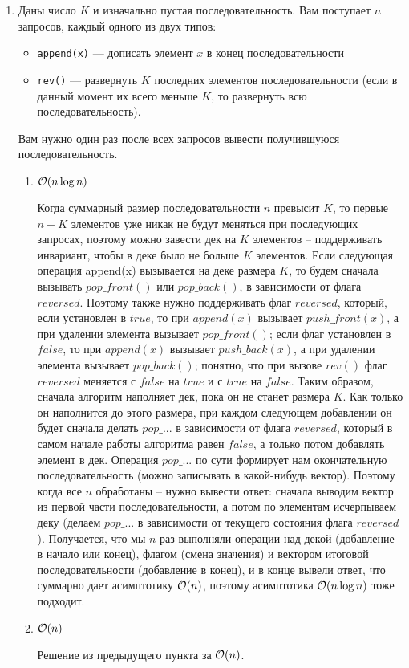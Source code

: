 \begin{enumerate}
  \item
    Даны число $K$ и изначально пустая последовательность. Вам поступает $n$ запросов, каждый одного из двух типов:
    \begin{itemize}
      \item \texttt{append(x)} --- дописать элемент $x$ в конец последовательности
      \item \texttt{rev()} ---
        развернуть $K$ последних элементов последовательности (если в данный момент их всего меньше $K$, то
        развернуть всю последовательность).
    \end{itemize}
    Вам нужно один раз после всех запросов вывести получившуюся последовательность.
    \begin{enumerate}
      \item $\mathcal{O}(n \log{n})$
      \begin{solution}
        Когда суммарный размер последовательности $n$ превысит $K$, то первые $n-K$ элементов уже никак не будут меняться при последующих запросах, поэтому можно завести дек на $K$ элементов -- поддерживать инвариант, чтобы в деке было не больше $K$ элементов. Если следующая операция append(x) вызывается на деке размера $K$, то будем сначала вызывать $pop\_front()$ или $pop\_back()$, в зависимости от флага $reversed$. Поэтому также нужно поддерживать флаг $reversed$, который, если установлен в $true$, то при $append(x)$ вызывает $push\_front(x)$, а при удалении элемента вызывает $pop\_front()$; если флаг установлен в $false$, то при $append(x)$ вызывает $push\_back(x)$, а при удалении элемента вызывает $pop\_back()$; понятно, что при вызове $rev()$ флаг $reversed$ меняется с $false$ на $true$ и с $true$ на $false$. Таким образом, сначала алгоритм наполняет дек, пока он не станет размера $K$. Как только он наполнится до этого размера, при каждом следующем добавлении он будет сначала делать $pop\_...$ в зависимости от флага $reversed$, который в самом начале работы алгоритма равен $false$, а только потом добавлять элемент в дек. Операция $pop\_...$ по сути формирует нам окончательную последовательность (можно записывать в какой-нибудь вектор). Поэтому когда все $n$ обработаны -- нужно вывести ответ: сначала выводим вектор из первой части последовательности, а потом по элементам исчерпываем деку (делаем $pop\_...$ в зависимости от текущего состояния флага $reversed$). Получается, что мы $n$ раз выполняли операции над декой (добавление в начало или конец), флагом (смена значения) и вектором итоговой последовательности (добавление в конец), и в конце вывели ответ, что суммарно дает асимптотику $\mathcal{O}(n)$, поэтому асимптотика $\mathcal{O}(n \log n)$ тоже подходит.
      \end{solution}
      \item $\mathcal{O}(n)$
      \begin{solution}
        Решение из предыдущего пункта за $\mathcal{O}(n)$.
      \end{solution}
    \end{enumerate}


\end{enumerate}
